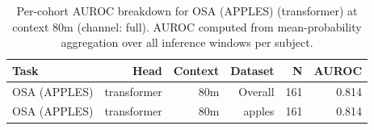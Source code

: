 \begin{table}[ht]
\centering
\caption{Per-cohort AUROC breakdown for OSA (APPLES) (transformer) at context 80m (channel: full). AUROC computed from mean-probability aggregation over all inference windows per subject.}
\label{tab:cohort_osa_binary_apples_postqc_transformer_full}
\begin{tabular}{lrrrrr}
\toprule
Task & Head & Context & Dataset & N & AUROC \\
\midrule
OSA (APPLES) & transformer & 80m & Overall & 161 & 0.814 \\
OSA (APPLES) & transformer & 80m & apples & 161 & 0.814 \\
\bottomrule
\end{tabular}
\end{table}